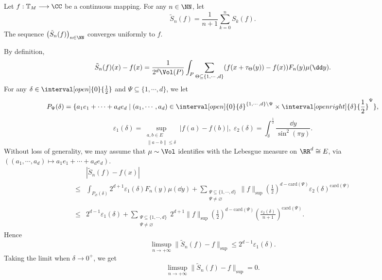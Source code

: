 \begin{theoremenv}[F\'ejer]
    Let $f : \mathbb{T}_{M} \longrightarrow \CC$ be a continuous mapping.
    For any $n \in \NN$, let
    $$\tilde{S}_n (f) = \frac{1}{n + 1} \sum_{k=0}^{n} S_{k}(f).$$
    The sequence $\left(\tilde{S}_n(f)\right)_{n \in \NN}$ converges uniformly to $f$.
\end{theoremenv}
\begin{proofenv}
    By definition,
    $$\tilde{S}_{n}(f)(x) - f(x) = \frac{1}{2^d\Vol(P)} \int_{P} \sum_{\Theta \subseteq \{1,\cdots,d\}} (f(x + \tau_{\Theta}(y)) - f(x)) F_{n}(y) \mu(\dd y).$$
    For any $\delta \in \interval[open]{0}{\frac{1}{2}}$ and $\Psi \subseteq \{1,\cdots,d\}$, we let
    $$P_{\Psi}(\delta) = \{a_1 e_1 + \cdots + a_d e_d \mid (a_1,\cdots,a_d) \in \interval[open]{0}{\delta}^{\{1,\cdots,d\} \setminus \Psi} \times \interval[open right]{\delta}{\frac{1}{2}}^\Psi\},$$
    $$\varepsilon_1(\delta) = \sup_{\substack{a,b \in E\\\|a-b\| \le \delta}} |f(a) - f(b)|, \; \varepsilon_2(\delta) = \int_{\delta}^{\frac{1}{2}} \frac{\dd y}{\sin^2(\pi y)}.$$
    Without loss of generality, we may assume that $\mu \sim \Vol$ identifies with the Lebesgue measure on $\RR^d \cong E$, via $((a_1,\cdots,a_d) \longmapsto a_1 e_1 + \cdots + a_d e_d)$.
    $$\begin{aligned}
        & |\tilde{S}_{n} (f) - f(x)|\\
        \le & \int_{P_{\varnothing}(\delta)} 2^{d+1} \varepsilon_{1}(\delta) F_{n}(y) \mu(\dd y) + \sum_{\substack{\Psi \subseteq \{1,\cdots,d\}\\\Psi \neq \varnothing}} \|f\|_{\text{sup}} \left(\frac{1}{2}\right)^{d - \mathrm{card}(\Psi)} \varepsilon_2(\delta)^{\mathrm{card}(\Psi)}\\
        \le & 2^{d-1} \varepsilon_1(\delta) + \sum_{\substack{\Psi \subseteq \{1,\cdots,d\}\\\Psi \neq \varnothing}} 2^{d+1} \|f\|_{\text{sup}} \left(\frac{1}{2}\right)^{d - \mathrm{card}(\Psi)} \left(\frac{\varepsilon_2(\delta)}{n+1}\right)^{\mathrm{card}(\Psi)}.
    \end{aligned}$$
    Hence
    $$\limsup_{n \to +\infty} \|\tilde{S}_n(f) - f\|_{\text{sup}} \le 2^{d-1} \varepsilon_1(\delta).$$
    Taking the limit when $\delta \to 0^+$, we get
    $$\limsup_{n \to +\infty} \|\tilde{S}_n(f) - f\|_{\text{sup}} = 0.$$
\end{proofenv}


